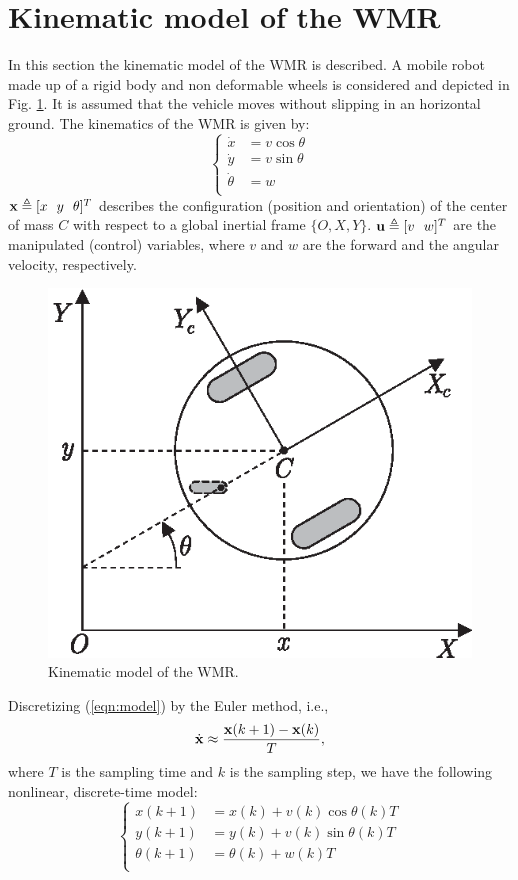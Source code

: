 \documentclass[twocolumn]{IEEEtran} %
\begin{document}
\section{Kinematic model of the WMR}\label{sec:model}
In this section the kinematic model of the WMR is described. A mobile robot made up of a rigid body and non deformable wheels is considered and depicted in Fig. \ref{fig:robot}. It is assumed that the vehicle moves without slipping in an horizontal ground. The kinematics of the WMR is given by:
\begin{equation}\label{eqn:model}
	\left\{
		\begin{aligned}
			\dot x	  &= v\cos\theta \\
			\dot y	  &= v\sin\theta \\
			\dot \theta &= w \\
		\end{aligned}
	\right.
\end{equation}
${\bf x}\triangleq[x~~y~~\theta]^T$ describes the configuration (position and orientation) of the center of mass $C$ with respect to a global inertial frame $\{O,X,Y\}$. ${\bf u}\triangleq[v~~w]^T$ are the manipulated (control) variables, where $v$ and $w$ are the forward and the angular velocity, respectively.
\begin{figure}[t]\begin{center}
    \includegraphics[width=.67\linewidth]{Figures/robot.eps}
    \caption{Kinematic model of the WMR.}
    \label{fig:robot}
\end{center}\end{figure}

Discretizing (\ref{eqn:model}) by the Euler method, i.e.,
\begin{equation*}
	\dot{\bf x} \approx \frac{{\bf x}(k+1)-{\bf x}(k)}{T},
\end{equation*}
where $T$ is the sampling time and $k$ is the sampling step, we have the following nonlinear, discrete-time model:
\begin{equation}\label{eqn:discretemodel}
	\left\{
		\begin{aligned}
			x(k+1)	    &= x(k) + v(k)\cos\theta(k)T \\
			y(k+1)	    &= y(k) + v(k)\sin\theta(k)T \\
			\theta(k+1) &= \theta(k) + w(k)T \\
		\end{aligned}
	\right.
\end{equation} 
\end{document}
